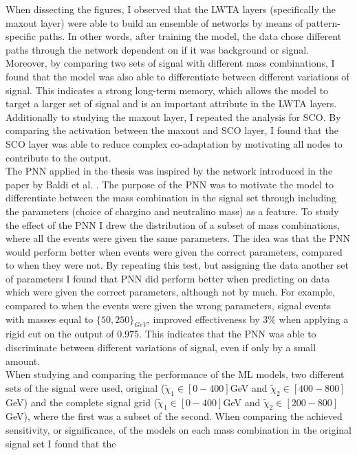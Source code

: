 When dissecting the figures, I observed that the \ac{LWTA} layers (specifically the maxout layer) were able to build an ensemble of networks by means of pattern-specific paths. In other words, after training 
the model, the data chose different paths through the network dependent on if it was background or signal. Moreover, by comparing two sets of signal with different mass combinations, I found that the model 
was also able to differentiate between different variations of signal. This indicates a strong long-term memory, which allows the model to target a larger set of signal and is an important attribute
in the \ac{LWTA} layers. Additionally to studying the maxout layer, I repeated the analysis for \ac{SCO}. By comparing the activation between the maxout and \ac{SCO} layer, I found that the \ac{SCO} layer 
was able to reduce complex co-adaptation by motivating all nodes to contribute to the output.
\\\newline
The \ac{PNN} applied in the thesis was inspired by the network introduced in the paper by Baldi et al. \cite{PNN}. The purpose of the \ac{PNN} was to motivate the model to differentiate between the mass combination 
in the signal set through including the parameters (choice of chargino and neutralino mass) as a feature. To study the effect of the \ac{PNN} I drew the distribution of a subset of mass combinations, where all the events were given the same parameters.
The idea was that the \ac{PNN} would perform better when events were given the correct parameters, compared to when they were not. By repeating this test, but assigning the data another set of parameters I found that \ac{PNN} did 
perform better when predicting on data which were given the correct parameters, although not by much. For example, compared to when the events were given the wrong parameters, signal events with masses equal to $\{50,250\}_{GeV}$, 
improved effectiveness by $3\%$ when applying a rigid cut on the output of 0.975. This indicates that the \ac{PNN} was able to discriminate between different variations of signal, even if only by 
a small amount.
\\\newline
When studying and comparing the performance of the \ac{ML} models, two different sets of the signal were used, original ($\tilde{\chi}_1\in[0-400]$GeV and  $\tilde{\chi}_2\in[400-800]$GeV) and the complete signal grid ($\tilde{\chi}_1\in[0-400]$GeV 
and $\tilde{\chi}_2\in[200-800]$GeV), where the first was a subset of the second. When comparing the achieved sensitivity, or significance, of the models on each mass combination in the original signal set I found that the 
